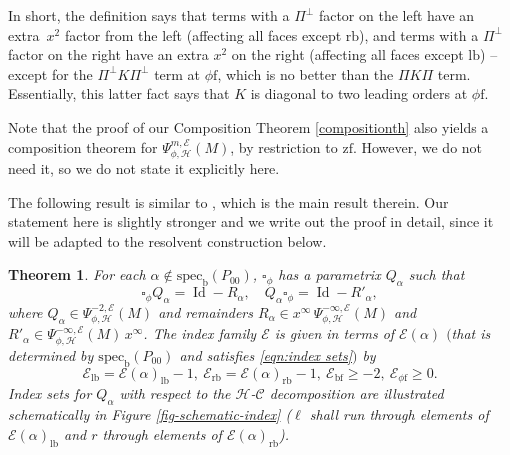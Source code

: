 \documentclass[JEP,XML,SOM,Unicode,NoFloatCountersInSection,published]{cedram}
\theoremstyle{plain}
\newtheorem{Th}{Theorem}[section]
\theoremstyle{definition}
\newcommand{\Hmath}{{\mathscr{H}}}
\newcommand\calE{{\mathcal E}}
\newcommand{\phif}{{\phi\mathrm{f}}}
\newcommand{\lf}{{\mathrm{lb}}}
\newcommand{\rf}{{\mathrm{rb}}}
\newcommand{\bb}{{\mathrm{b}}}
\newcommand{\bbf}{{\mathrm{bf}}}
\newcommand{\zf}{{\mathrm{zf}}}
\newcommand{\specb}{\mathrm{spec}_\bb}
\DeclareMathOperator{\Id}{Id}
\newcommand{\Piperp}{\Pi^\perp}
\begin{document}
In short, the definition says that terms with a $\Piperp$ factor on the left have an extra~$x^2$ factor from the left (affecting all faces except $\rf$), and terms with a $\Piperp$ factor on the right have an extra $x^2$ on the right (affecting all faces except $\lf$) -- except for the $\Piperp K\Piperp$ term at $\phif$, which is no better than the $\Pi K\Pi$ term.
Essentially, this latter fact says that $K$ is diagonal to two leading orders at $\phif$.

Note that the proof of our Composition Theorem \ref{compositionth} also yields a composition theorem for $\Psi^{m,\calE}_{\phi,\Hmath}(M)$, by restriction to $\zf$. However, we do not need it, so we do not state it explicitly here.

The following result is similar to \cite[Th.\,12]{grieser-para}, which is the main result therein.
Our statement here is slightly stronger
and we write out the proof in detail, since it will be adapted
to the resolvent construction below.

\begin{Th}\label{thm:split phi-parametrix}
For each $\alpha \notin \specb(P_{00})$, $\square_\phi$ has a parametrix $Q_\alpha$ such that
\[
\square_\phi Q_\alpha = \Id - R_\alpha,\quad Q_\alpha\square_\phi = \Id - R'_\alpha,
\]
where $Q_\alpha\!\in\! \Psi^{-2,\calE}_{\phi, \mathscr{H}}(M)$ and remainders
$R_\alpha\!\in\! x^\infty\,\Psi^{-\infty,\calE}_{\phi, \mathscr{H}}(M)$ and $R'_\alpha\!\in\!\Psi^{-\infty,\calE}_{\phi, \mathscr{H}}(M)\,x^\infty$.
The index family $\calE$ is given in terms of $\calE(\alpha)$ $($that is determined by $\specb(P_{00})$
and satisfies \eqref{eqn:index sets}$)$ by
\[
\calE_{\lf}=\calE(\alpha)_\lf-1, \ \calE_\rf=\calE(\alpha)_\rf-1, \ \calE_\bbf\geq-2, \ \calE_{\phif}\geq 0.
\]
Index sets for $Q_\alpha$ with respect to the $\mathscr{H}$-$\mathscr{C}$ decomposition
are illustrated schematically in Figure \ref{fig-schematic-index} ($\ell$ shall run through elements of
$\calE(\alpha)_\lf$ and $r$ through elements of $\calE(\alpha)_\rf$).
\end{Th}
\end{document}
